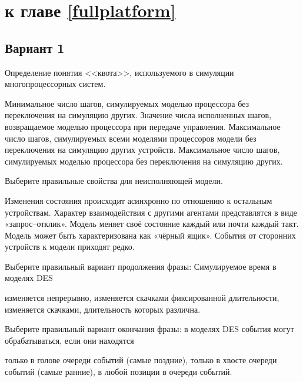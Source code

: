 \section{\Questions к главе \ref{fullplatform}} %

\subsection*{Вариант 1}

\begin{questions}

\question[3] Определение понятия <<квота>>, используемого в симуляции многопроцессорных систем.
\begin{choices}
    \choice Минимальное число шагов, симулируемых моделью процессора без переключения на симуляцию других.
    \choice Значение числа исполненных шагов, возвращаемое моделью процессора при передаче управления.
    \choice Максимальное число шагов, симулируемых всеми моделями процессоров модели без переключения на симуляцию других устройств.
    \correctchoice Максимальное число шагов, симулируемых моделью процессора без переключения на симуляцию других.
\end{choices}


\question[3] Выберите правильные свойства для неисполняющей модели.
\begin{choices}
    \correctchoice Изменения состояния происходит асинхронно по отношению к остальным устройствам.
    \correctchoice Характер взаимодействия с другими агентами представлятся в виде «запрос--отклик».
    \choice Модель меняет своё состояние каждый или почти каждый такт.
    \correctchoice Модель может быть характеризована как «чёрный ящик».
    \choice События от сторонних устройств к модели приходят редко.
\end{choices}

\question[3] Выберите правильный вариант продолжения фразы: Симулируемое время в моделях DES 
\begin{choices}
    \choice изменяется непрерывно,
    \choice изменяется скачками фиксированной длительности,
    \correctchoice изменяется скачками, длительность которых различна.
\end{choices}
    
\question[3] Выберите правильный вариант окончания фразы: в моделях DES события могут обрабатываться, если они находятся
\begin{choices}
    \choice только в голове очереди событий (самые поздние),
    \correctchoice только в хвосте очереди событий (самые ранние),
    \choice в любой позиции в очереди событий.
\end{choices}


\end{questions}
